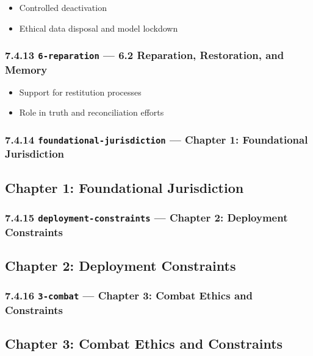 \documentclass[11pt]{article}
\begin{document}
\begin{itemize}\setlength\itemsep{0pt}
\item Controlled deactivation
\item Ethical data disposal and model lockdown
\end{itemize}


\subsubsection*{7.4.13 \texttt{6-reparation} — 6.2 Reparation, Restoration, and Memory}


\begin{itemize}\setlength\itemsep{0pt}
\item Support for restitution processes
\item Role in truth and reconciliation efforts
\end{itemize}


\subsubsection*{7.4.14 \texttt{foundational-jurisdiction} — Chapter 1: Foundational Jurisdiction}


\subsection*{Chapter 1: Foundational Jurisdiction}


\subsubsection*{7.4.15 \texttt{deployment-constraints} — Chapter 2: Deployment Constraints}


\subsection*{Chapter 2: Deployment Constraints}


\subsubsection*{7.4.16 \texttt{3-combat} — Chapter 3: Combat Ethics and Constraints}


\subsection*{Chapter 3: Combat Ethics and Constraints}
\end{document}
